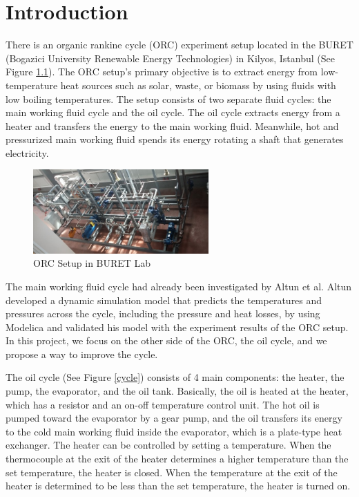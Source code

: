 \chapter{Introduction}

There is an organic rankine cycle (ORC) experiment setup located in the BURET (Bogazici University Renewable Energy Technologies) in Kilyos, Istanbul (See Figure \ref{exsetup}). The ORC setup's primary objective is to extract energy from low-temperature heat sources such as solar, waste, or biomass by using fluids with low boiling temperatures. The setup consists of two separate fluid cycles: the main working fluid cycle and the oil cycle. The oil cycle extracts energy from a heater and transfers the energy to the main working fluid. Meanwhile, hot and pressurized main working fluid spends its energy rotating a shaft that generates electricity.

\begin{figure}[H]
		\centering
		\includegraphics[width=0.6\textwidth]{images/exsetup.jpg}
		\caption[ORC Setup in BURET Lab]{ORC Setup in BURET Lab}
		\label{exsetup} 
\end{figure} 
	
The main working fluid cycle had already been investigated by Altun et al. Altun developed a dynamic simulation model that predicts the temperatures and pressures across the cycle, including the pressure and heat losses, by using Modelica and validated his model with the experiment results of the ORC setup. In this project, we focus on the other side of the ORC, the oil cycle, and we propose a way to improve the cycle.
	
The oil cycle (See Figure \ref{cycle}) consists of 4 main components: the heater, the pump, the evaporator, and the oil tank. Basically, the oil is heated at the heater, which has a resistor and an on-off temperature control unit. The hot oil is pumped toward the evaporator by a gear pump, and the oil transfers its energy to the cold main working fluid inside the evaporator, which is a plate-type heat exchanger. The heater can be controlled by setting a temperature. When the thermocouple at the exit of the heater determines a higher temperature than the set temperature, the heater is closed. When the temperature at the exit of the heater is determined to be less than the set temperature, the heater is turned on.
	
